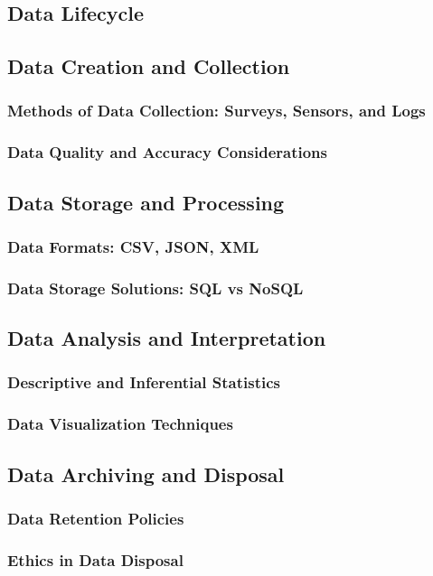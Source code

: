 \documentclass[12pt, oneside]{book}
\begin{document}
\subsection{Data Lifecycle}
\subsection{Data Creation and Collection}
\subsubsection{Methods of Data Collection: Surveys, Sensors, and Logs}
\subsubsection{Data Quality and Accuracy Considerations}
\subsection{Data Storage and Processing}
\subsubsection{Data Formats: CSV, JSON, XML}
\subsubsection{Data Storage Solutions: SQL vs NoSQL}
\subsection{Data Analysis and Interpretation}
\subsubsection{Descriptive and Inferential Statistics}
\subsubsection{Data Visualization Techniques}
\subsection{Data Archiving and Disposal}
\subsubsection{Data Retention Policies}
\subsubsection{Ethics in Data Disposal}
\end{document}
